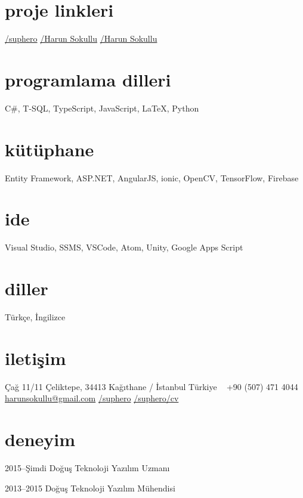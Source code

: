 \documentclass[]{../friggeri-cv} %
\begin{document}

\begin{aside}
\section{proje linkleri}
\href{https://github.com/suphero}{\faGithub/suphero}
\href{https://play.google.com/store/apps/developer?id=Harun+Sokullu}{\faAndroid/Harun Sokullu}
\href{https://itunes.apple.com/tr/developer/harun-sokullu/id1265151811}{\faApple/Harun Sokullu}
\section{programlama dilleri}
C\#, T-SQL, TypeScript, JavaScript, \LaTeX, Python
\section{kütüphane}
Entity Framework, ASP.NET, AngularJS, ionic, OpenCV, TensorFlow, Firebase
\section{ide}
Visual Studio, SSMS, VSCode, Atom, Unity, Google Apps Script
\section{diller}
Türkçe, İngilizce
\section{iletişim}
Çağ 11/11
Çeliktepe, 34413
Kağıthane / İstanbul
Türkiye
~
+90 (507) 471 4044
~
\href{mailto:harunsokullu@gmail.com}{harunsokullu@gmail.com}
\href{https://www.linkedin.com/in/suphero}{\faLinkedin/suphero}
\href{https://github.com/suphero/cv/raw/master/Turkish/Harun\%20Sokullu.pdf}{\faGithub/suphero/cv}
~~
\end{aside}

\section{deneyim}

\begin{entrylist}

\entry
{2015--Şimdi}
{Doğuş Teknoloji}
{}
{Yazılım Uzmanı}

\entry
{2013--2015}
{Doğuş Teknoloji}
{}
{Yazılım Mühendisi}

\end{entrylist}
\end{document}
